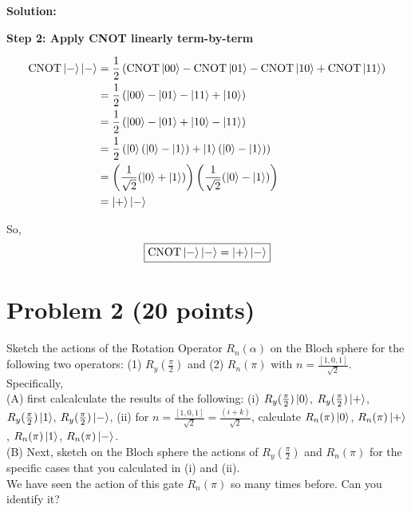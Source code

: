 \documentclass[11pt]{article}
\newenvironment{solution}
{\par\noindent\textbf{Solution:}\par}
{\vspace{1em}}
\begin{document}
\begin{solution}
\textbf{Step 2: Apply CNOT linearly term-by-term}

\[\begin{aligned}
\operatorname{CNOT}\ket{-}\ket{-} &= \frac{1}{2}\left(\operatorname{CNOT}\ket{00} - \operatorname{CNOT}\ket{01} - \operatorname{CNOT}\ket{10} + \operatorname{CNOT}\ket{11}\right) \\
&= \frac{1}{2}\left(\ket{00} - \ket{01} - \ket{11} + \ket{10}\right) \\
&= \frac{1}{2}\left(\ket{00} - \ket{01} + \ket{10} - \ket{11}\right) \\
&= \frac{1}{2}\left(\ket{0}(\ket{0} - \ket{1}) + \ket{1}(\ket{0} - \ket{1})\right) \\
&= \left(\frac{1}{\sqrt{2}}(\ket{0} + \ket{1})\right)\left(\frac{1}{\sqrt{2}}(\ket{0} - \ket{1})\right) \\
&= \ket{+}\ket{-}
\end{aligned}\]

So, \[\boxed{\operatorname{CNOT}\ket{-}\ket{-} = \ket{+}\ket{-}}\]

\end{solution}

\section*{Problem 2 (20 points)}

Sketch the actions of the Rotation Operator $R_n(\alpha)$ on the Bloch sphere for the following two operators: (1) $R_y(\frac{\pi}{2})$ and (2) $R_n(\pi)$ with $n = \frac{[1,0,1]}{\sqrt{2}}$. Specifically, \\
(A) first calcalculate the results of the following: (i) $R_y(\frac{\pi}{2})\ket{0}$, $R_y(\frac{\pi}{2})\ket{+}$, $R_y(\frac{\pi}{2})\ket{1}$, $R_y(\frac{\pi}{2})\ket{-}$, (ii) for $n = \frac{[1,0,1]}{\sqrt{2}} = \frac{(i+k)}{\sqrt{2}}$, calculate $R_n(\pi)\ket{0}$, $R_n(\pi)\ket{+}$, $R_n(\pi)\ket{1}$, $R_n(\pi)\ket{-}$. \\
(B) Next, sketch on the Bloch sphere the actions of $R_y(\frac{\pi}{2})$ and $R_n(\pi)$ for the specific cases that you calculated in (i) and (ii). \\
We have seen the action of this gate $R_n(\pi)$ so many times before. Can you identify it?
\end{document}
